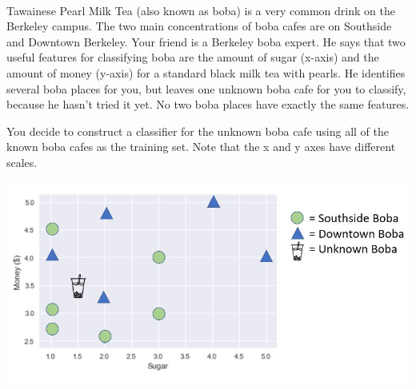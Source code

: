  \\ 

Tawainese Pearl Milk Tea (also known as boba) is a very common drink on the Berkeley campus. The two main concentrations of boba cafes are on Southside and Downtown Berkeley. Your friend is a Berkeley boba expert. He says that two useful features for classifying boba are the amount of sugar
(x-axis) and the amount of money (y-axis) for a standard black milk tea with pearls. He identifies several boba places for you, but leaves one unknown boba cafe for you to classify, because he hasn't tried it yet. No two boba places have exactly the same features.

You decide to construct a classifier for the unknown boba cafe using all of the known boba cafes as the training set. Note that the x and y axes have different scales.

\begin{center}
\includegraphics[scale=0.8]{classifiers.JPG}
\end{center}

